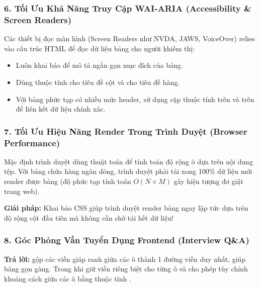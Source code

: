 \subsubsection{6. Tối Ưu Khả Năng Truy Cập WAI-ARIA (Accessibility \& Screen Readers)}

\begin{noteBox}
Các thiết bị đọc màn hình (Screen Readers như NVDA, JAWS, VoiceOver) relies vào cấu trúc HTML để đọc dữ liệu bảng cho người khiếm thị:
\begin{itemize}[leftmargin=1.5em, itemsep=2pt, parsep=0pt]
    \item Luôn khai báo  để mô tả ngắn gọn mục đích của bảng.
    \item Dùng thuộc tính  cho tiêu đề cột và  cho tiêu đề hàng.
    \item Với bảng phức tạp có nhiều mức header, sử dụng cặp thuộc tính  trên  và  trên  để liên kết dữ liệu chính xác.
\end{itemize}
\end{noteBox}

\subsubsection{7. Tối Ưu Hiệu Năng Render Trong Trình Duyệt (Browser Performance)}

\begin{tipBox}
Mặc định trình duyệt dùng thuật toán  để tính toán độ rộng ô dựa trên nội dung tệp. Với bảng chứa hàng ngàn dòng, trình duyệt phải tải xong 100\% dữ liệu mới render được bảng (độ phức tạp tính toán $O(N \times M)$ gây hiện tượng đơ giật trang web).

\textbf{Giải pháp:} Khai báo CSS  giúp trình duyệt render bảng ngay lập tức dựa trên độ rộng cột đầu tiên mà không cần chờ tải hết dữ liệu!
\end{tipBox}

\subsubsection{8. Góc Phỏng Vấn Tuyển Dụng Frontend (Interview Q\&A)}

\begin{conceptBox}
\textbf{Trả lời:}  gộp các viền giáp ranh giữa các ô thành 1 đường viền duy nhất, giúp bảng gọn gàng. Trong khi  giữ viền riêng biệt cho từng ô và cho phép tùy chỉnh khoảng cách giữa các ô bằng thuộc tính .
\end{conceptBox}

